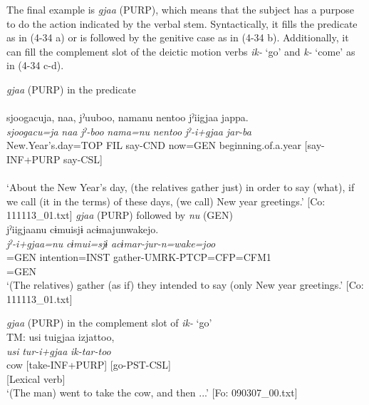 The final example is \textit{gjaa} (PURP), which means that the subject has a purpose to do the action indicated by the verbal stem. Syntactically, it fills the predicate as in (4-34 a) or is followed by the genitive case as in (4-34 b). Additionally, it can fill the complement slot of the deictic motion verbs \textit{ik-} ‘go’ and \textit{k-} ‘come’ as in (4-34 c-d).

\ea \label{ex:4.34}
  \ea \textit{gjaa} (PURP) in the predicate \label{ex:4.34a}\\\\
\gllll 
    {\textbar}sjoogacu{\textbar}ja,  naa,  jˀuuboo,  namanu  {\textbar}nentoo{\textbar}   jˀiigjaa  jappa.\\
      \textit{sjoogacu=ja}  \textit{naa}  \textit{jˀ-boo}  \textit{nama=nu}  \textit{nentoo}   \textit{jˀ-i+gjaa}  \textit{jar-ba}\\                                                                                               
      New.Year’s.day=TOP  FIL  say-CND  now=GEN  beginning.of.a.year                           [say-INF+PURP  say-CSL]\\                                                                                               
                                                                                               [Nominal predicate]\\
      \glt ‘About the New Year’s day, (the relatives gather just) in order to say (what), if we call (it in the terms) of these days, (we call) New year greetings.’ [Co: 111113\_01.txt]
\ex  \textit{gjaa} (PURP) followed by \textit{nu} (GEN)\\\label{ex:4.34b}
\gllll    jˀiigjaanu  cɨmuisjɨ  acɨmajunwakejo.\\
      \textit{jˀ-i+gjaa=nu}  \textit{cɨmui=sjɨ}  \textit{acɨmar-jur-n=wake=joo}\\
      [say-INF+PURP]=GEN  intention=INST  gather-UMRK-PTCP=CFP=CFM1\\
      [NP]=GEN    \\
      \glt       ‘(The relatives) gather (as if) they intended to say (only New year greetings.’ [Co: 111113\_01.txt]

\ex \textit{gjaa} (PURP) in the complement slot of \textit{ik-} ‘go’\\\label{ex:4.34c}
\gllll    TM:  usi  tuigjaa  izjattoo,\\
      \textit{usi}  \textit{tur-i+gjaa}  \textit{ik-tar-too}\\
      cow  [take-INF+PURP]  [go-PST-CSL]\\
        [Complement]  [Lexical verb]\\
      \glt       ‘(The man) went to take the cow, and then ...’ [Fo: 090307\_00.txt]

